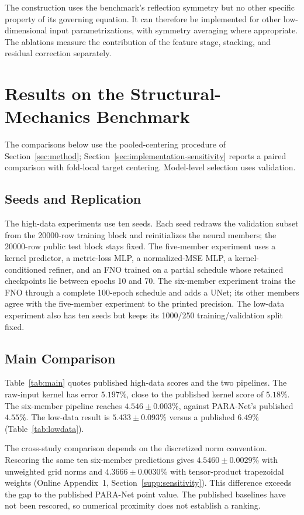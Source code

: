 \documentclass[twoside,11pt]{article}
\newcommand{\errSix}{4.546}          %
\newcommand{\errSixSd}{0.003}
\newcommand{\errKRRload}{5.197}      %
\newcommand{\errBestLow}{5.433}      %
\newcommand{\errBestLowSd}{0.093}    %
\newcommand{\pubBestHi}{4.55}        %
\newcommand{\pubBestLo}{6.49}        %
\newcommand{\sensGridPlain}{4.5460}
\newcommand{\sensGridPlainSd}{0.0029}
\newcommand{\sensGridWeighted}{4.3666}
\newcommand{\sensGridWeightedSd}{0.0030}
\begin{document}
The construction uses the benchmark's reflection symmetry but no other
specific property of its governing equation. It can therefore be implemented
for other low-dimensional input parametrizations, with symmetry averaging
where appropriate. The ablations measure the contribution of the feature
stage, stacking, and residual correction separately.


\section{Results on the Structural-Mechanics Benchmark}
\label{sec:experiments}
The comparisons below use the pooled-centering procedure of Section~\ref{sec:method}; Section~\ref{sec:implementation-sensitivity} reports a paired comparison with fold-local target centering. Model-level selection uses validation.

\subsection{Seeds and Replication}
\label{sec:seeds}
The high-data experiments use ten seeds. Each seed redraws the validation subset from the 20000-row training block and reinitializes the neural members; the 20000-row public test block stays fixed. The five-member experiment uses a kernel predictor, a metric-loss MLP, a normalized-MSE MLP, a kernel-conditioned refiner, and an FNO trained on a partial schedule whose retained checkpoints lie between epochs 10 and 70. The six-member experiment trains the FNO through a complete 100-epoch schedule and adds a UNet; its other members agree with the five-member experiment to the printed precision. The low-data experiment also has ten seeds but keeps its 1000/250 training/validation split fixed.

\subsection{Main Comparison}
Table~\ref{tab:main} quotes published high-data scores and the two pipelines. The raw-input kernel has error $\errKRRload\%$, close to the published kernel score of $5.18\%$. The six-member pipeline reaches $\errSix\pm\errSixSd\%$, against PARA-Net's published $\pubBestHi\%$. The low-data result is $\errBestLow\pm\errBestLowSd\%$ versus a published $\pubBestLo\%$ (Table~\ref{tab:lowdata}).

The cross-study comparison depends on the discretized norm convention.
Rescoring the same ten six-member predictions gives
$\sensGridPlain\pm\sensGridPlainSd\%$ with unweighted grid norms and
$\sensGridWeighted\pm\sensGridWeightedSd\%$ with tensor-product trapezoidal
weights (Online Appendix~1, Section~\ref{supp:sensitivity}). This difference exceeds the
gap to the published PARA-Net point value. The published baselines have not
been rescored, so numerical proximity does not establish a ranking.
\end{document}
